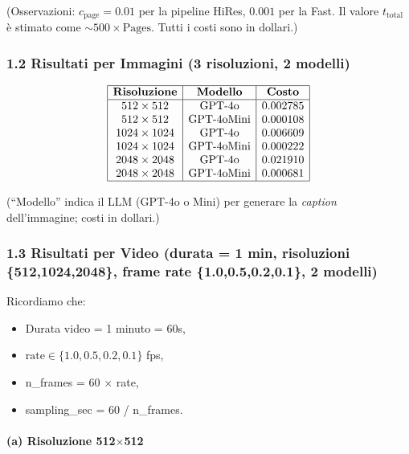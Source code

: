 \documentclass[a4paper,12pt]{article}
\begin{document}
\noindent
{\small
(Osservazioni: \(
c_{\text{page}} = 0.01\) per la pipeline HiRes, \(0.001\) per la Fast. Il valore \(t_{\text{total}}\) è stimato come \(\sim 500\times\text{Pages}\). Tutti i costi sono in dollari.)
}

\bigskip

\subsubsection*{1.2 Risultati per Immagini (3 risoluzioni, 2 modelli)}

\[
\begin{array}{|c|c|c|}
\hline
\textbf{Risoluzione} & \textbf{Modello} & \textbf{Costo} \\
\hline
512\times512   & \text{GPT-4o}    & 0.002785\\
512\times512   & \text{GPT-4oMini}& 0.000108\\
1024\times1024 & \text{GPT-4o}    & 0.006609\\
1024\times1024 & \text{GPT-4oMini}& 0.000222\\
2048\times2048 & \text{GPT-4o}    & 0.021910\\
2048\times2048 & \text{GPT-4oMini}& 0.000681\\
\hline
\end{array}
\]

\noindent
{\small
(“Modello” indica il LLM (GPT-4o o Mini) per generare la \emph{caption} dell'immagine; costi in dollari.)
}

\bigskip

\subsubsection*{1.3 Risultati per Video (durata = 1 min, risoluzioni \{512,1024,2048\}, frame rate \{1.0,0.5,0.2,0.1\}, 2 modelli)}

Ricordiamo che:
\begin{itemize}
\item Durata video = 1 minuto = 60s,
\item \(\text{rate}\in\{1.0, 0.5, 0.2, 0.1\}\) fps,
\item n\_frames = 60 $\times$ rate,
\item sampling\_sec = 60 / n\_frames.
\end{itemize}

\paragraph{(a) Risoluzione 512$\times$512}
\end{document}
